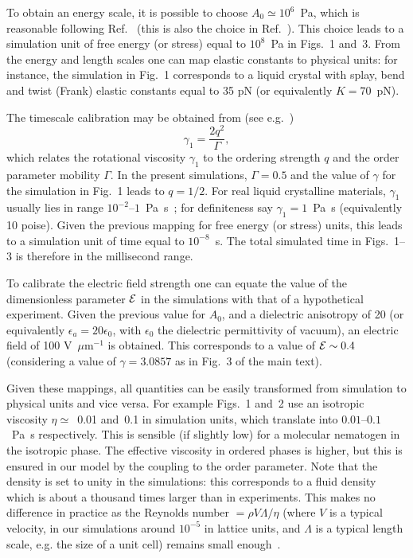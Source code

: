 \documentclass[12pt]{article}
\begin{document}
To obtain an energy scale, it is possible to choose $A_0 \simeq 10^6$~Pa,
which is reasonable following Ref.~\cite{mermin} (this is also the choice in
Ref.~\cite{domaingrowth}). This choice leads to a simulation unit of
free energy (or stress) equal to $10^{8}$~Pa in Figs.~1 and~3.
From the energy and length scales one can map elastic constants to
physical units: for instance, the simulation in Fig.~1 corresponds to
a liquid crystal with splay, bend and twist (Frank) elastic constants
equal to 35 pN (or equivalently $K=70$~pN).

The timescale calibration may be obtained from (see e.g.~\cite{denniston})
\begin{equation}
\gamma_1=\frac{2q^2}{\Gamma},
\end{equation}
which relates the rotational viscosity $\gamma_1$ to the ordering strength
$q$ and the order parameter mobility $\Gamma$.
In the present simulations, $\Gamma = 0.5$ and the value of $\gamma$
for the simulation in Fig.~1 leads to $q=1/2$.   
For real liquid crystalline materials, $\gamma_1$ usually lies in range
$10^{-2}$--$1$~Pa~s~\cite{deGennes}; for definiteness say
$\gamma_1 = 1$~Pa~s (equivalently 10 poise). Given the previous mapping for
free energy (or stress) units, this leads to a simulation unit of time equal
to $10^{-8}$~s. The total simulated time in Figs.~1--3 is therefore in the
millisecond range. 

To calibrate the electric field strength 
one can equate the value of the dimensionless parameter ${\cal E}$ in the 
simulations with that of a hypothetical experiment.
Given the previous value for $A_0$, and a dielectric anisotropy of 20
(or equivalently $\epsilon_a=20\epsilon_0$, with $\epsilon_0$ the
dielectric permittivity of vacuum), an electric field
of 100 V~$\mu$m$^{-1}$ is obtained. This corresponds to a value of
${\cal E}\sim 0.4$ (considering a value of $\gamma=3.0857$ as in
Fig.~3 of the main text).

Given these mappings, all quantities can be easily transformed from
simulation to physical units and vice versa. For example Figs.~1 and~2
use an isotropic viscosity $\eta \simeq$~0.01 and~0.1 in simulation units,
which translate into $0.01$--$0.1$~Pa~s respectively. This is sensible (if 
slightly low) for a molecular nematogen in the isotropic phase. 
The effective viscosity in ordered phases is higher, but this is ensured
in our model by the coupling to the order parameter.
Note that the density is set to unity in the simulations: this
corresponds to a fluid density which is about a thousand times larger
than in experiments. This makes no difference in practice as
the Reynolds number $= \rho V\Lambda/\eta$ (where $V$ is a typical
velocity, in our simulations around $10^{-5}$ in lattice units, 
and $\Lambda$ is a typical length scale, e.g. the size of a unit cell) 
remains small enough~\cite{codef}. 
\end{document}
